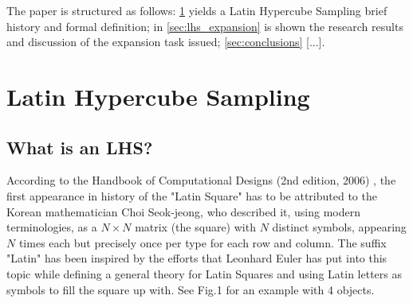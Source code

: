 \documentclass[12pt]{article}
\begin{document}
The paper is structured as follows: \cref{sec:lhs} yields a Latin Hypercube Sampling brief history and formal definition; in \cref{sec:lhs_expansion} is shown the research results and discussion of the expansion task issued; \cref{sec:conclusions} [...].

\section{Latin Hypercube Sampling}
\label{sec:lhs}
\subsection{What is an LHS?}
\label{subsec:what_is_an_lhs}
According to the Handbook of Computational Designs (2nd edition, 2006) , the first appearance in history of the "Latin Square" has to be attributed to the Korean mathematician Choi Seok-jeong, who described it, using modern terminologies, as a $N \times N$ matrix (the square) with $N$ distinct symbols, appearing $N$ times each but precisely once per type for each row and column. The suffix "Latin" has been inspired by the efforts that Leonhard Euler has put into this topic while defining a general theory for Latin Squares  and using Latin letters as symbols to fill the square up with. See Fig.1 for an example with 4 objects.
\end{document}
